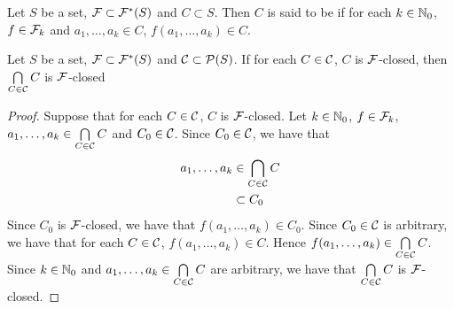 \begin{defn}
	Let $S$ be a set, $\mathcal{F} \subset \mathcal{F}^*(S)$ and $C \subset S$. Then $C$ is said to be   if for each $k \in \mathbb{N}_0$, $f \in \mathcal{F}_k$ and $a_1, \ldots, a_k \in C$, $f(a_1, \ldots, a_k) \in C$.
\end{defn}

\begin{ex}
	Let $S$ be a set, $\mathcal{F} \subset \mathcal{F}^*(S)$ and $\mathcal{C} \subset \mathcal{P}(S)$. If for each $C \in \mathcal{C}$, $C$ is  $\mathcal{F}$-closed, then $\bigcap\limits_{C \in \mathcal{C}} C$ is $\mathcal{F}$-closed
\end{ex}

\begin{proof}
	Suppose that for each $C \in \mathcal{C}$, $C$ is  $\mathcal{F}$-closed. Let $k \in \mathbb{N}_0$, $f \in \mathcal{F}_k$, $a_1, \ldots, a_k \in \bigcap\limits_{C \in \mathcal{C}} C$ and $C_0 \in \mathcal{C}$. Since $C_0 \in \mathcal{C}$, we have that 
	\begin{align*}
		a_1, \ldots, a_k 
		& \in \bigcap_{C \in \mathcal{C}} C \\
		& \subset C_0
	\end{align*}
	Since $C_0$ is $\mathcal{F}$-closed, we have that $f(a_1, \ldots, a_k) \in C_0$. Since $C_0 \in \mathcal{C}$ is arbitrary, we have that for each $C \in \mathcal{C}$, $f(a_1, \ldots, a_k) \in C$. Hence $f(a_1, \ldots, a_k) \in \bigcap\limits_{C \in \mathcal{C}} C$. Since $k \in \mathbb{N}_0$ and $a_1, \ldots, a_k \in \bigcap\limits_{C \in \mathcal{C}} C$ are arbitrary, we have that $\bigcap\limits_{C \in \mathcal{C}} C$ is $\mathcal{F}$-closed.
\end{proof}

